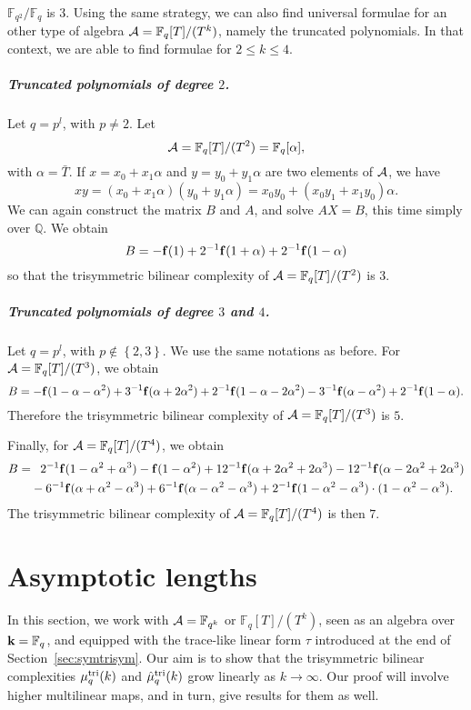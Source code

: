 \documentclass[11pt]{article}
\begin{document}
$\mathbb{F}_{q^2}/\mathbb{F}_{q}$ is $3$. Using the same strategy, we can also
find universal formulae for an other type of algebra $\mathcal{A} =
\mathbb{F}_{q}[T]/(T^k)$, namely the truncated polynomials. In that context, we
are able to find formulae for $2\leq k \leq 4$.
\subparagraph{Truncated polynomials of degree $2$.} Let $q=p^l$, with $p\neq2$. Let
\[
  \mathcal{A} = \mathbb{F}_{q}[T]/(T^2) = \mathbb{F}_q[\alpha],
\]
with $\alpha=\bar T$. If $x =
x_0 + x_1\alpha$ and $y = y_0 + y_1\alpha$ are two elements of
$\mathcal{A}$, we have
\[
  xy = (x_0+x_1\alpha)(y_0+y_1\alpha)=x_0y_0+
  (x_0y_1+x_1y_0)\alpha.
\]
We can again construct the matrix $B$ and $A$, and solve $AX=B$, this time
simply over
$\mathbb{Q}$. We obtain
\[
  B = -\mathbf{f}(1) + 2^{-1}\mathbf{f}(1+\alpha)+2^{-1}\mathbf{f}(1-\alpha)
\]
so that the trisymmetric bilinear complexity of
$\mathcal{A}=\mathbb{F}_q[T]/(T^2)$ is $3$.
\subparagraph{Truncated polynomials of degree $3$ and $4$.} Let $q=p^l$, with
$p\notin\left\{ 2, 3 \right\}$. We use the same notations as before. For
$\mathcal{A}=\mathbb{F}_{q}[T]/(T^3)$, we obtain
\[
  B =
  -\mathbf{f}(1-\alpha-\alpha^2)+3^{-1}\mathbf{f}(\alpha+2\alpha^2)
  +2^{-1}\mathbf{f}(1-\alpha-2\alpha^2) -
  3^{-1}\mathbf{f}(\alpha-\alpha^2)
  +2^{-1}\mathbf{f}(1-\alpha).
\]
Therefore the trisymmetric bilinear complexity of
$\mathcal{A}=\mathbb{F}_q[T]/(T^3)$ is $5$.

Finally, for $\mathcal{A}=\mathbb{F}_{q}[T]/(T^4)$, we obtain
\begin{equation*}
  \begin{split}
    B =&\phantom{-}2^{-1}\mathbf{f}(1-\alpha^2+\alpha^3)-\mathbf{f}(1-\alpha^2)
  +12^{-1}\mathbf{f}(\alpha+2\alpha^2+2\alpha^3)
  -12^{-1}\mathbf{f}(\alpha-2\alpha^2+2\alpha^3)\\
  &-6^{-1}\mathbf{f}(\alpha+\alpha^2-\alpha^3)
  +6^{-1}\mathbf{f}(\alpha-\alpha^2-\alpha^3)
  +2^{-1}\mathbf{f}(1-\alpha^2-\alpha^3)\cdot(1-\alpha^2-\alpha^3).
  \end{split}
\end{equation*}
The trisymmetric bilinear complexity of $\mathcal{A}=\mathbb{F}_q[T]/(T^4)$ is then $7$.


\section{Asymptotic lengths}
\label{sec:asymptotic}
In this section, we work with $\mathcal{A}=\mathbb{F}_{q^k}$ or $\mathbb{F}_q[T]/(T^k)$, seen as an algebra over $\mathbf{k}=\mathbb{F}_q$, and equipped with the trace-like linear form $\tau$ introduced at the end of Section~\ref{sec:symtrisym}.
Our aim is to show that the trisymmetric bilinear complexities $\mu^{\textrm{tri}}_q(k)$ and $\hat\mu^{\textrm{tri}}_q(k)$ grow linearly as $k\to\infty$.
Our proof will involve higher multilinear maps, and in turn, give results for them as well.
\end{document}
